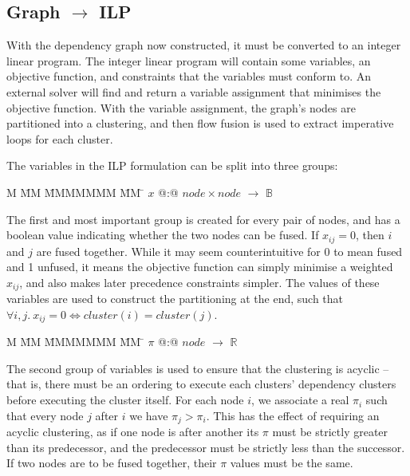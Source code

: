 \subsection{Graph $\to$ ILP}
With the dependency graph now constructed, it must be converted to an integer linear program. The integer linear program will contain some variables, an objective function, and constraints that the variables must conform to. An external solver will find and return a variable assignment that minimises the objective function. With the variable assignment, the graph's nodes are partitioned into a clustering, and then flow fusion\cite{lippmeier2013flow} is used to extract imperative loops for each cluster.

The variables in the ILP formulation can be split into three groups:

\begin{tabbing}
M   \= MM \= MMMMMMM \= MM \= \kill
$x$   \> @:@  \> $node \times node$ \> $\to$ \> $\mathbb{B}$
\end{tabbing}
The first and most important group is created for every pair of nodes, and has a boolean value indicating whether the two nodes can be fused. If $x_{ij} = 0$, then $i$ and $j$ are fused together. While it may seem counterintuitive for 0 to mean fused and 1 unfused, it means the objective function can simply minimise a weighted $x_{ij}$, and also makes later precedence constraints simpler. The values of these variables are used to construct the partitioning at the end, such that $\forall i,j.\ x_{ij} = 0 \iff cluster(i) = cluster(j)$. 

\begin{tabbing}
M   \= MM \= MMMMMMM \= MM \= \kill
$\pi$ \> @:@  \> $node$             \> $\to$ \> $\mathbb{R}$
\end{tabbing}
The second group of variables is used to ensure that the clustering is acyclic -- that is, there must be an ordering to execute each clusters' dependency clusters before executing the cluster itself.
For each node $i$, we associate a real $\pi_i$ such that every node $j$ after $i$ we have $\pi_j > \pi_i$. This has the effect of requiring an acyclic clustering, as if one node is after another its $\pi$ must be strictly greater than its predecessor, and the predecessor must be strictly less than the successor. If two nodes are to be fused together, their $\pi$ values must be the same.

